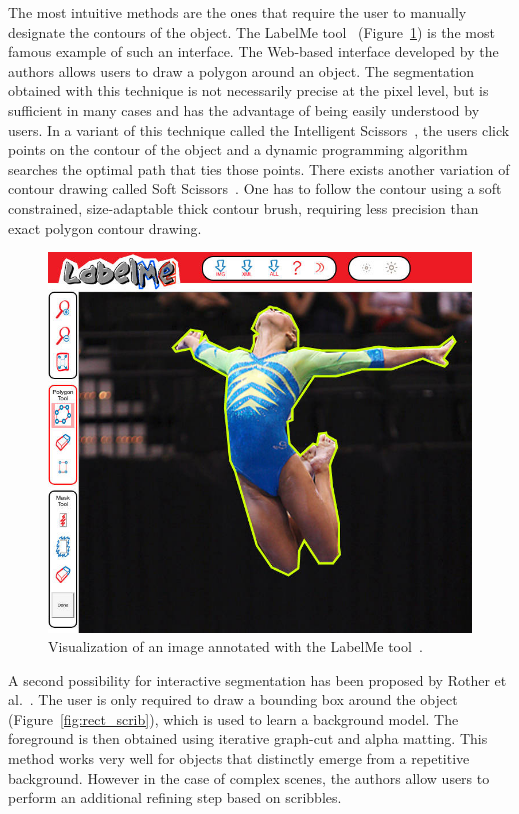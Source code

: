 The most intuitive methods are the ones that require
the user to manually designate the contours of the object.
The LabelMe tool~\cite{russell2008labelme}
(Figure~\ref{fig:labelme}) is the most famous example
of such an interface.
The Web-based interface developed by the authors
allows users to draw a polygon around an object.
The segmentation obtained with this technique
is not necessarily precise at the pixel level,
but is sufficient in many cases and has the advantage of being
easily understood by users.
In a variant of this technique called
the Intelligent Scissors~\cite{mortensen1995intelligent},
the users click points on the contour of the object and a dynamic
programming algorithm searches the optimal path that ties those points.
There exists another variation of contour drawing called
Soft Scissors~\cite{wang2007soft}.
One has to follow the contour using a soft constrained,
size-adaptable thick contour brush,
requiring less precision than exact polygon contour drawing.


\begin{figure}[ht]
\centering
\includegraphics[width=0.8\columnwidth]{assets/img/LabelMe.jpg}
\caption{Visualization of an image annotated with the LabelMe tool~\cite{russell2008labelme}.}%
\label{fig:labelme}
\end{figure}


A second possibility for interactive segmentation has been proposed
by Rother et al.~\cite{rother_grabcut:_2004}.
The user is only required to draw a bounding box around the object
(Figure~\ref{fig:rect_scrib}), which is used to learn
a background model. The foreground is then obtained
using iterative graph-cut and alpha matting.
This method works very well for objects that distinctly emerge
from a repetitive background.
However in the case of complex scenes, the authors allow users
to perform an additional refining step based on scribbles.


